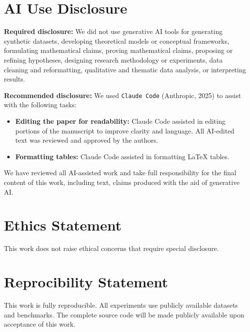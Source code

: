\section*{AI Use Disclosure}

\textbf{Required disclosure:}
We did not use generative AI tools for generating synthetic datasets, developing theoretical models or conceptual frameworks, formulating mathematical claims, proving mathematical claims, proposing or refining hypotheses, designing research methodology or experiments, data cleaning and reformatting, qualitative and thematic data analysis, or interpreting results.

\textbf{Recommended disclosure:}
We used \texttt{Claude Code} (Anthropic, 2025) to assist with the following tasks:
\begin{itemize}
    \item \textbf{Editing the paper for readability:} Claude Code assisted in editing portions of the manuscript to improve clarity and language. All AI-edited text was reviewed and approved by the authors.
    \item \textbf{Formatting tables:} Claude Code assisted in formatting LaTeX tables.
\end{itemize}

We have reviewed all AI-assisted work and take full responsibility for the final content of this work, including text, claims produced with the aid of generative AI.

\section*{Ethics Statement}

This work does not raise ethical concerns that require special disclosure.

\section*{Reprocibility Statement}

This work is fully reproducible. All experiments use publicly available datasets and
benchmarks. The complete source code will be made publicly available upon acceptance of
this work.